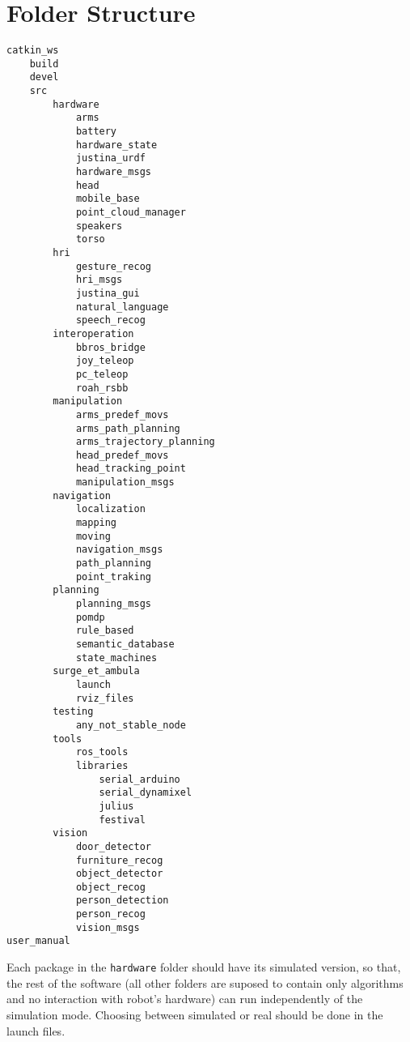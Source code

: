 \documentclass[letterpaper,10pt]{article}
\begin{document}
\section{Folder Structure}

\begin{verbatim}
catkin_ws
    build
    devel
    src
        hardware
            arms
            battery
            hardware_state
            justina_urdf
            hardware_msgs
            head
            mobile_base
            point_cloud_manager
            speakers
            torso
        hri
            gesture_recog
            hri_msgs
            justina_gui
            natural_language
            speech_recog
        interoperation
            bbros_bridge
            joy_teleop
            pc_teleop
            roah_rsbb
        manipulation
            arms_predef_movs
            arms_path_planning
            arms_trajectory_planning
            head_predef_movs
            head_tracking_point
            manipulation_msgs
        navigation
            localization
            mapping
            moving
            navigation_msgs
            path_planning
            point_traking
        planning
            planning_msgs
            pomdp
            rule_based
            semantic_database
            state_machines
        surge_et_ambula
            launch
            rviz_files
        testing
            any_not_stable_node
        tools
            ros_tools
            libraries
                serial_arduino
                serial_dynamixel
                julius
                festival
        vision
            door_detector
            furniture_recog
            object_detector
            object_recog
            person_detection
            person_recog
            vision_msgs
user_manual
\end{verbatim}


Each package in the \texttt{hardware} folder should have its simulated version, so that, the rest of the software (all other folders are suposed to contain only algorithms and no interaction with robot's hardware) can run independently of the simulation mode. Choosing between simulated or real should be done in the launch files. 
\end{document}

